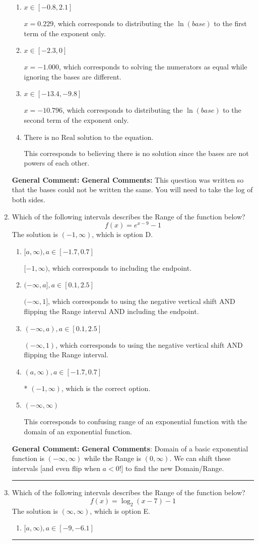 \documentclass{extbook}[14pt]
\newcommand{\litem}[1]{\item #1

\rule{\textwidth}{0.4pt}}
\begin{document}
\begin{enumerate}
{\begin{enumerate}[label=\Alph*.]
* $x = 2.477$, which is the correct option.
\item \( x \in [-0.8, 2.1] \)

$x = 0.229$, which corresponds to distributing the $\ln(base)$ to the first term of the exponent only.
\item \( x \in [-2.3, 0] \)

$x = -1.000$, which corresponds to solving the numerators as equal while ignoring the bases are different.
\item \( x \in [-13.4, -9.8] \)

$x = -10.796$, which corresponds to distributing the $\ln(base)$ to the second term of the exponent only.
\item \( \text{There is no Real solution to the equation.} \)

This corresponds to believing there is no solution since the bases are not powers of each other.
\end{enumerate}

\textbf{General Comment:} \textbf{General Comments:} This question was written so that the bases could not be written the same. You will need to take the log of both sides.
}
\litem{
Which of the following intervals describes the Range of the function below?
\[ f(x) = e^{x-9}-1 \]The solution is \( (-1, \infty) \), which is option D.\begin{enumerate}[label=\Alph*.]
\item \( [a, \infty), a \in [-1.7, 0.7] \)

$[-1, \infty)$, which corresponds to including the endpoint.
\item \( (-\infty, a], a \in [0.1, 2.5] \)

$(-\infty, 1]$, which corresponds to using the negative vertical shift AND flipping the Range interval AND including the endpoint.
\item \( (-\infty, a), a \in [0.1, 2.5] \)

$(-\infty, 1)$, which corresponds to using the negative vertical shift AND flipping the Range interval.
\item \( (a, \infty), a \in [-1.7, 0.7] \)

* $(-1, \infty)$, which is the correct option.
\item \( (-\infty, \infty) \)

This corresponds to confusing range of an exponential function with the domain of an exponential function.
\end{enumerate}

\textbf{General Comment:} \textbf{General Comments}: Domain of a basic exponential function is $(-\infty, \infty)$ while the Range is $(0, \infty)$. We can shift these intervals [and even flip when $a<0$!] to find the new Domain/Range.
}
\litem{
Which of the following intervals describes the Range of the function below?
\[ f(x) = \log_2{(x-7)}-1 \]The solution is \( (\infty, \infty) \), which is option E.\begin{enumerate}[label=\Alph*.]
\item \( [a, \infty), a \in [-9, -6.1] \)


\end{enumerate}}
\end{enumerate}
\end{document}
